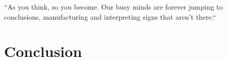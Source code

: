
\begin{savequote}[85mm]
``As you think, so you become. Our busy minds are forever jumping to conclusions, manufacturing and interpreting signs that aren’t there.``
\end{savequote}


\chapter{Conclusion}
\label{ch:conclusion}

